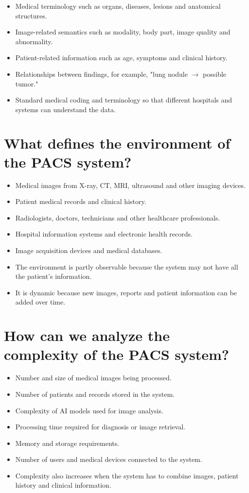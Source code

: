 \documentclass[11pt]{article}
\begin{document}
\begin{itemize}[noitemsep]
    \item Medical terminology such as organs, diseases, lesions and anatomical structures.
    \item Image-related semantics such as modality, body part, image quality and abnormality.
    \item Patient-related information such as age, symptoms and clinical history.
    \item Relationships between findings, for example, "lung nodule $\rightarrow$ possible tumor."
    \item Standard medical coding and terminology so that different hospitals and systems can understand the data.
\end{itemize}

\section{What defines the environment of the PACS system?}

\begin{itemize}[noitemsep]
    \item Medical images from X-ray, CT, MRI, ultrasound and other imaging devices.
    \item Patient medical records and clinical history.
    \item Radiologists, doctors, technicians and other healthcare professionals.
    \item Hospital information systems and electronic health records.
    \item Image acquisition devices and medical databases.
    \item The environment is partly observable because the system may not have all the patient's information.
    \item It is dynamic because new images, reports and patient information can be added over time.
\end{itemize}

\section{How can we analyze the complexity of the PACS system?}

\begin{itemize}[noitemsep]
    \item Number and size of medical images being processed.
    \item Number of patients and records stored in the system.
    \item Complexity of AI models used for image analysis.
    \item Processing time required for diagnosis or image retrieval.
    \item Memory and storage requirements.
    \item Number of users and medical devices connected to the system.
    \item Complexity also increases when the system has to combine images, patient history and clinical information.
\end{itemize}
\end{document}

